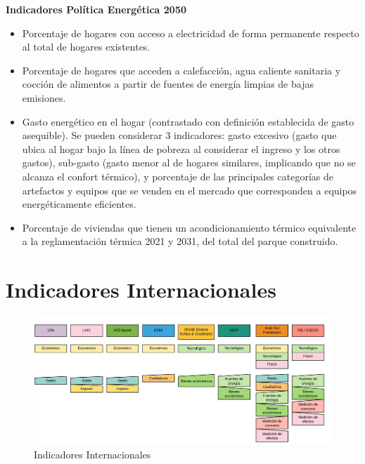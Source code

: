 \documentclass[
]{book}
\providecommand{\tightlist}{%
  \setlength{\itemsep}{0pt}\setlength{\parskip}{0pt}}
\begin{document}
\textbf{Indicadores Política Energética 2050}

\begin{itemize}
\tightlist
\item
  Porcentaje de hogares con acceso a electricidad de forma permanente respecto al total de hogares existentes.
\item
  Porcentaje de hogares que acceden a calefacción, agua caliente sanitaria y cocción de alimentos a partir de fuentes de energía limpias de bajas emisiones.
\item
  Gasto energético en el hogar (contrastado con definición establecida de gasto asequible). Se pueden considerar 3 indicadores: gasto excesivo (gasto que ubica al hogar bajo la línea de pobreza al considerar el ingreso y los otros gastos), sub-gasto (gasto menor al de hogares similares, implicando que no se alcanza el confort térmico), y porcentaje de las principales categorías de artefactos y equipos que se venden en el mercado que corresponden a equipos energéticamente eficientes.
\item
  Porcentaje de viviendas que tienen un acondicionamiento térmico equivalente a la reglamentación térmica 2021 y 2031, del total del parque construido.
\end{itemize}

\hypertarget{indicadores-internacionales}{%
\section{Indicadores Internacionales}\label{indicadores-internacionales}}

\begin{figure}

{\centering \includegraphics[width=1\linewidth]{images/ind_internacionales} 

}

\caption{Indicadores Internacionales}\label{fig:unnamed-chunk-7}
\end{figure}
\end{document}
